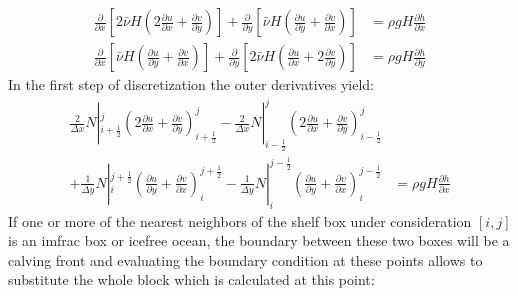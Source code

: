 \documentclass[a4paper,10pt]{article}
\begin{document}
\begin{align}
\frac{\partial}{\partial x}\left[ 2\bar\nu H\left( 2\frac{\partial u}{\partial x} + \frac{\partial v}{\partial y} \right)\right] + \frac{\partial }{\partial y}\left[\bar\nu H\left(\frac{\partial u}{\partial y}+\frac{\partial v}{\partial x}  \right) \right] &= \rho gH \frac{\partial h}{\partial x} \label{SSA1} \\
\frac{\partial}{\partial x}\left[ \bar\nu H\left( \frac{\partial u}{\partial y} + \frac{\partial v}{\partial x} \right)\right] + \frac{\partial }{\partial y}\left[2\bar\nu H\left(\frac{\partial u}{\partial x}+2\frac{\partial v}{\partial y}  \right) \right] &= \rho gH \frac{\partial h}{\partial y} \label{SSA2}
\end{align}
\noindent In the first step of discretization the outer derivatives yield:
\begin{align}
\frac{2}{\Delta x}N|_{i+\frac{1}{2}}^j\left( 2\frac{\partial u}{\partial x} + \frac{\partial v}{\partial y} \right)_{i+\frac{1}{2}}^j
- \frac{2}{\Delta x}N|_{i-\frac{1}{2}}^j\left( 2\frac{\partial u}{\partial x} + \frac{\partial v}{\partial y} \right)_{i-\frac{1}{2}}^j \nonumber \\
+ \frac{1}{\Delta y}N|_i^{j+\frac{1}{2}}\left(\frac{\partial u}{\partial y}+\frac{\partial v}{\partial x}\right)_i^{j+\frac{1}{2}} 
- \frac{1}{\Delta y}N|_i^{j-\frac{1}{2}}\left(\frac{\partial u}{\partial y}+\frac{\partial v}{\partial x}\right)_i^{j-\frac{1}{2}} 
&= \rho gH \frac{\partial h}{\partial x} \label{SSA1_dis1} 
\end{align}
If one or more of the nearest neighbors of the shelf box under consideration $[i,j]$ is an imfrac box or icefree ocean, the boundary between these two boxes will be a calving front and evaluating the boundary condition at these points allows to substitute the whole block which is calculated at this point:
\end{document}
